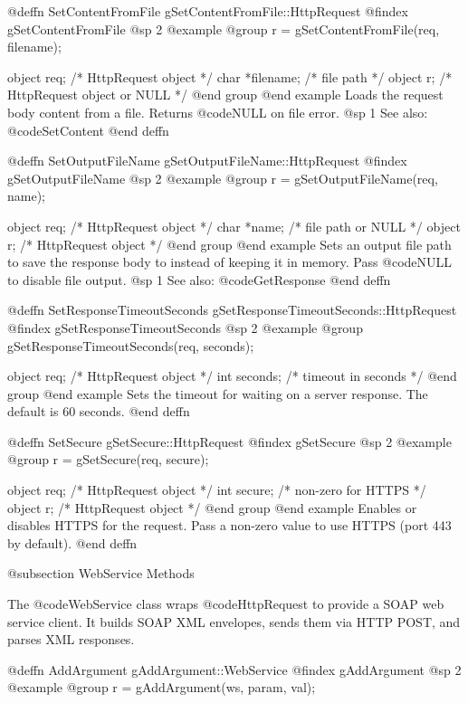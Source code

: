 @deffn {SetContentFromFile} gSetContentFromFile::HttpRequest
@findex gSetContentFromFile
@sp 2
@example
@group
r = gSetContentFromFile(req, filename);

object  req;       /*  HttpRequest object         */
char    *filename; /*  file path                  */
object  r;         /*  HttpRequest object or NULL */
@end group
@end example
Loads the request body content from a file.  Returns @code{NULL} on
file error.
@sp 1
See also:  @code{SetContent}
@end deffn



@deffn {SetOutputFileName} gSetOutputFileName::HttpRequest
@findex gSetOutputFileName
@sp 2
@example
@group
r = gSetOutputFileName(req, name);

object  req;    /*  HttpRequest object  */
char    *name;  /*  file path or NULL   */
object  r;      /*  HttpRequest object  */
@end group
@end example
Sets an output file path to save the response body to instead of
keeping it in memory.  Pass @code{NULL} to disable file output.
@sp 1
See also:  @code{GetResponse}
@end deffn



@deffn {SetResponseTimeoutSeconds} gSetResponseTimeoutSeconds::HttpRequest
@findex gSetResponseTimeoutSeconds
@sp 2
@example
@group
gSetResponseTimeoutSeconds(req, seconds);

object  req;      /*  HttpRequest object  */
int     seconds;  /*  timeout in seconds  */
@end group
@end example
Sets the timeout for waiting on a server response.  The default is
60 seconds.
@end deffn



@deffn {SetSecure} gSetSecure::HttpRequest
@findex gSetSecure
@sp 2
@example
@group
r = gSetSecure(req, secure);

object  req;     /*  HttpRequest object  */
int     secure;  /*  non-zero for HTTPS  */
object  r;       /*  HttpRequest object  */
@end group
@end example
Enables or disables HTTPS for the request.  Pass a non-zero value
to use HTTPS (port 443 by default).
@end deffn



@subsection WebService Methods

The @code{WebService} class wraps @code{HttpRequest} to provide a
SOAP web service client.  It builds SOAP XML envelopes, sends them
via HTTP POST, and parses XML responses.



@deffn {AddArgument} gAddArgument::WebService
@findex gAddArgument
@sp 2
@example
@group
r = gAddArgument(ws, param, val);

